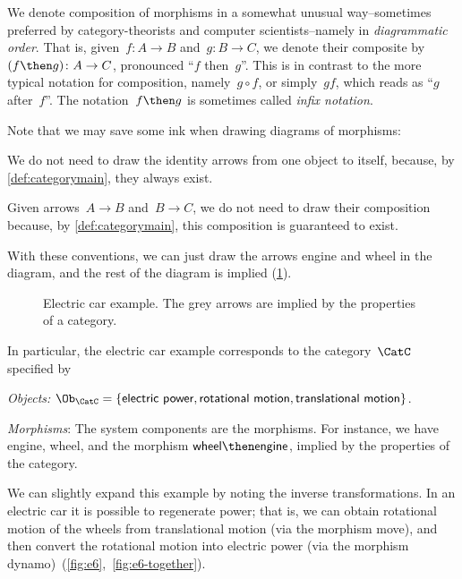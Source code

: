 \begin{remark}
We denote composition of morphisms in a somewhat unusual way--sometimes preferred by category-theorists and computer scientists--namely in \emph{diagrammatic order}. That is, given~$f\colon A\to B$ and~$g\colon B\to C$, we denote their composite by~$(f\then g)\colon A\to C$, pronounced ``$f$ then~$g$''. This is in contrast to the more typical notation for composition, namely~$g\circ f$, or simply~$gf$, which reads as ``$g$ after~$f$''. The notation~$f\then g$ is sometimes called \emph{infix notation}.
\end{remark}

Note that we may save some ink when drawing diagrams of morphisms:
\begin{compactitem}
\item We do not need to draw the identity arrows from one object to itself, because, by \cref{def:categorymain}, they always exist.
\item  Given arrows~$A\to B$ and~$B \to C$, we do not need to draw their composition because, by \cref{def:categorymain}, this composition is guaranteed to exist.
\end{compactitem}

With these conventions, we can just draw the arrows \textsf{engine} and \textsf{wheel} in the diagram, and the rest of the diagram is implied (\cref{fig:e5}).

\begin{figure}[h!]
    \centering
    \caption{Electric car example. The grey arrows are implied by the properties
    of a category.\label{fig:e5} }
\end{figure}

In particular, the electric car example corresponds to the category~$\CatC$ specified by
\begin{compactitem}
    \item \emph{Objects:} $\Ob_\CatC=\{\textsf{electric}\ \textsf{power},\textsf{rotational motion},\textsf{translational motion}\}$.
    \item \emph{Morphisms}: The system components are the morphisms. For instance, we have \textsf{engine}, \textsf{wheel}, and the morphism $\textsf{wheel} \then \textsf{engine}$, implied by the properties of the category.
\end{compactitem}

We can slightly expand this example by noting the inverse transformations. In an electric car
it is possible to regenerate power; that is, we can obtain \textsf{rotational motion} of the wheels from
\textsf{translational motion} (via the morphism \textsf{move}), and then convert the \textsf{rotational motion} into \textsf{electric power} (via the morphism \textsf{dynamo})~(\cref{fig:e6},~\cref{fig:e6-together}).

